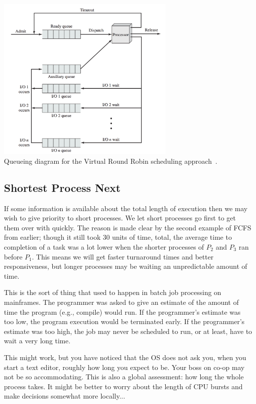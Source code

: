 \begin{center}
	\includegraphics[width=0.65\textwidth]{images/virtual-round-robin.png}\\
	Queueing diagram for the Virtual Round Robin scheduling approach~\cite{osi}.
\end{center}

\subsection*{Shortest Process Next}
If some information is available about the total length of execution then we may wish to give priority to short processes. We let short processes go first to get them over with quickly. The reason is made clear by the second example of FCFS from earlier; though it still took 30 units of time, total, the average time to completion of a task was a lot lower when the shorter processes of $P_{2}$ and $P_{3}$ ran before $P_{1}$. This means we will get faster turnaround times and better responsiveness, but longer processes may be waiting an unpredictable amount of time.

This is the sort of thing that used to happen in batch job processing on mainframes. The programmer was asked to give an estimate of the amount of time the program (e.g., compile) would run. If the programmer's estimate was too low, the program execution would be terminated early. If the programmer's estimate was too high, the job may never be scheduled to run, or at least, have to wait a very long time. 

This might work, but you have noticed that the OS does not ask you, when you start a text editor, roughly how long you expect to be. Your boss on co-op may not be so accommodating. This is also a global assessment: how long the whole process takes. It might be better to worry about the length of CPU bursts and make decisions somewhat more locally...

